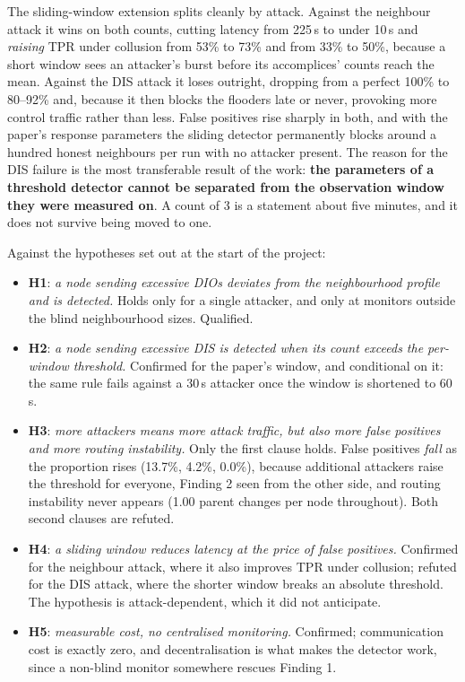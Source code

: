 \documentclass[11pt, a4paper]{article}
\begin{document}
The sliding-window extension splits cleanly by attack. Against the neighbour attack it wins on both counts, cutting latency from 225\,s to under 10\,s and \textit{raising} TPR under collusion from 53\% to 73\% and from 33\% to 50\%, because a short window sees an attacker's burst before its accomplices' counts reach the mean. Against the DIS attack it loses outright, dropping from a perfect 100\% to 80--92\% and, because it then blocks the flooders late or never, provoking more control traffic rather than less. False positives rise sharply in both, and with the paper's response parameters the sliding detector permanently blocks around a hundred honest neighbours per run with no attacker present. The reason for the DIS failure is the most transferable result of the work: \textbf{the parameters of a threshold detector cannot be separated from the observation window they were measured on}. A count of 3 is a statement about five minutes, and it does not survive being moved to one.

Against the hypotheses set out at the start of the project:

\enlargethispage{4\baselineskip}
{\small
\begin{itemize}
  \item \textbf{H1}: \textit{a node sending excessive DIOs deviates from the neighbourhood profile and is detected.} Holds only for a single attacker, and only at monitors outside the blind neighbourhood sizes. Qualified.
  \item \textbf{H2}: \textit{a node sending excessive DIS is detected when its count exceeds the per-window threshold.} Confirmed for the paper's window, and conditional on it: the same rule fails against a 30\,s attacker once the window is shortened to 60\,s.
  \item \textbf{H3}: \textit{more attackers means more attack traffic, but also more false positives and more routing instability.} Only the first clause holds. False positives \textit{fall} as the proportion rises (13.7\%, 4.2\%, 0.0\%), because additional attackers raise the threshold for everyone, Finding 2 seen from the other side, and routing instability never appears (1.00 parent changes per node throughout). Both second clauses are refuted.
  \item \textbf{H4}: \textit{a sliding window reduces latency at the price of false positives.} Confirmed for the neighbour attack, where it also improves TPR under collusion; refuted for the DIS attack, where the shorter window breaks an absolute threshold. The hypothesis is attack-dependent, which it did not anticipate.
  \item \textbf{H5}: \textit{measurable cost, no centralised monitoring.} Confirmed; communication cost is exactly zero, and decentralisation is what makes the detector work, since a non-blind monitor somewhere rescues Finding 1.
\end{itemize}}

\end{document}
